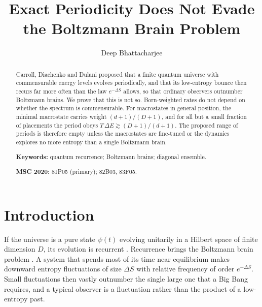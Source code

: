 \documentclass[11pt]{amsart}
\theoremstyle{definition}
\begin{document}
\title[Periodicity and Boltzmann brains]{Exact Periodicity Does Not Evade\\ the Boltzmann Brain Problem}

\author{Deep Bhattacharjee}
\address{Formerly, Electro-Gravitational Space Propulsion Laboratory (EGSPL), Bhubaneswar, Odisha 751030, India}
\address{Formerly, University of Calcutta (Heramba Chandra College), 23/49 Gariahat Road, Golpark, Kolkata 700029, West Bengal, India}

\begin{abstract}
Carroll, Diachenko and Dulani proposed that a finite quantum universe with commensurable energy levels evolves periodically, and that its low-entropy bounce then recurs far more often than the law $e^{-\Delta S}$ allows, so that ordinary observers outnumber Boltzmann brains. We prove that this is not so. Born-weighted rates do not depend on whether the spectrum is commensurable. For macrostates in general position, the minimal macrostate carries weight $(d+1)/(D+1)$, and for all but a small fraction of placements the period obeys $T\,\Delta E\gtrsim(D+1)/(d+1)$. The proposed range of periods is therefore empty unless the macrostates are fine-tuned or the dynamics explores no more entropy than a single Boltzmann brain.

\medskip\noindent\textbf{Keywords:} quantum recurrence; Boltzmann brains; diagonal ensemble.

\smallskip\noindent\textbf{MSC 2020:} 81P05 (primary); 82B03, 83F05.
\end{abstract}

\maketitle

\section{Introduction}\label{sec:intro}

If the universe is a pure state $\psi(t)$ evolving unitarily in a Hilbert space of finite dimension $D$, its evolution is recurrent \cite{BL57}. Recurrence brings the Boltzmann brain problem \cite{DKS02,AS04}. A system that spends most of its time near equilibrium makes downward entropy fluctuations of size $\Delta S$ with relative frequency of order $e^{-\Delta S}$. Small fluctuations then vastly outnumber the single large one that a Big Bang requires, and a typical observer is a fluctuation rather than the product of a low-entropy past.
\end{document}
